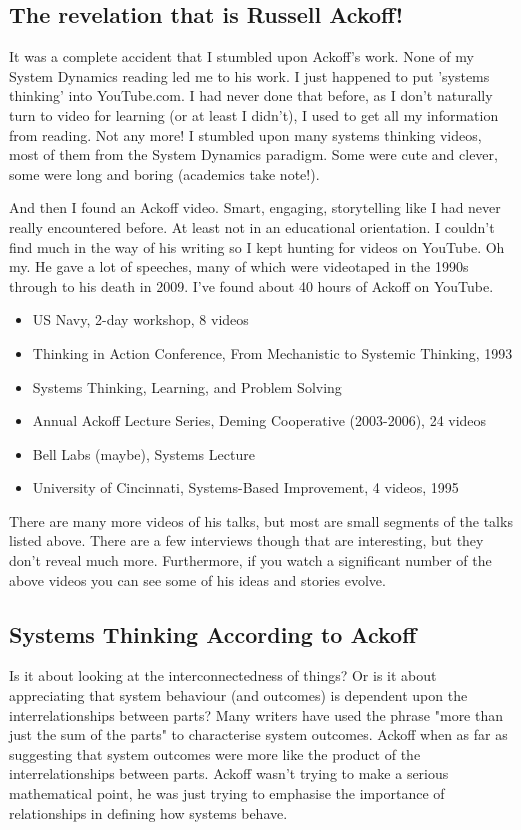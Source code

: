 \subsection{The revelation that is Russell Ackoff!} 
It was a complete accident that I stumbled upon Ackoff's work. None of my System Dynamics reading led me to his work. I just happened to put 'systems thinking' into YouTube.com. I had never done that before, as I don't naturally turn to video for learning (or at least I didn't), I used to get all my information from reading. Not any more! I stumbled upon many systems thinking videos, most of them from the System Dynamics paradigm. Some were cute and clever, some were long and boring (academics take note!).

And then I found an Ackoff video. Smart, engaging, storytelling like I had never really encountered before. At least not in an educational orientation. I couldn't find much in the way of his writing so I kept hunting for videos on YouTube. Oh my. He gave a lot of speeches, many of which were videotaped in the 1990s through to his death in 2009. I've found about 40 hours of Ackoff on YouTube.

\begin{itemize}
	\item US Navy, 2-day workshop, 8 videos
	\item Thinking in Action Conference, From Mechanistic to Systemic Thinking, 1993
	\item Systems Thinking, Learning, and Problem Solving
	\item Annual Ackoff Lecture Series, Deming Cooperative (2003-2006), 24 videos
	\item Bell Labs (maybe), Systems Lecture
	\item University of Cincinnati, Systems-Based Improvement, 4 videos, 1995
\end{itemize}

There are many more videos of his talks, but most are small segments of the talks listed above. There are a few interviews though that are interesting, but they don't reveal much more. Furthermore, if you watch a significant number of the above videos you can see some of his ideas and stories evolve.

\subsection{Systems Thinking According to Ackoff}

Is it about looking at the interconnectedness of things? Or is it about appreciating that system behaviour (and outcomes) is dependent upon the interrelationships between parts? Many writers have used the phrase "more than just the sum of the parts" to characterise system outcomes. Ackoff when as far as suggesting that system outcomes were more like the product of the interrelationships between parts. Ackoff wasn't trying to make a serious mathematical point, he was just trying to emphasise the importance of relationships in defining how systems behave\cite{AckoffXXtbd}.

